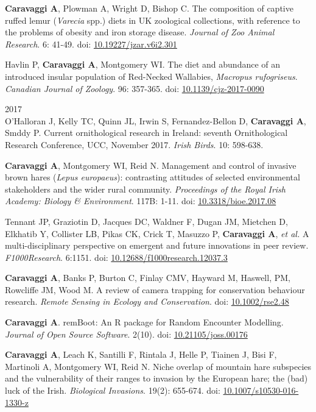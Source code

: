 \documentclass[]{article}
\begin{document}
\textbf{Caravaggi A}, Plowman A, Wright D, Bishop C. The composition of
captive ruffed lemur (\emph{Varecia} spp.) diets in UK zoological
collections, with reference to the problems of obesity and iron storage
disease. \emph{Journal of Zoo Animal Research}. 6: 41-49. doi:
\href{https://doi.org/10.19227/jzar.v6i2.301}{10.19227/jzar.v6i2.301}

Havlin P, \textbf{Caravaggi A}, Montgomery WI. The diet and abundance of
an introduced insular population of Red-Necked Wallabies, \emph{Macropus
rufogriseus}. \emph{Canadian Journal of Zoology}. 96: 357-365. doi:
\url{10.1139/cjz-2017-0090}

2017\\
O'Halloran J, Kelly TC, Quinn JL, Irwin S, Fernandez-Bellon D,
\textbf{Caravaggi A}, Smddy P. Current ornithological research in
Ireland: seventh Ornithological Research Conference, UCC, November 2017.
\emph{Irish Birds}. 10: 598-638.

\textbf{Caravaggi A}, Montgomery WI, Reid N. Management and control of
invasive brown hares (\emph{Lepus europaeus}): contrasting attitudes of
selected environmental stakeholders and the wider rural community.
\emph{Proceedings of the Royal Irish Academy: Biology \& Environment}.
117B: 1-11. doi:
\href{http://www.jstor.org/stable/10.3318/bioe.2017.08}{10.3318/bioe.2017.08}

Tennant JP, Graziotin D, Jacques DC, Waldner F, Dugan JM, Mietchen D,
Elkhatib Y, Collister LB, Pikas CK, Crick T, Masuzzo P,
\textbf{Caravaggi A}, \emph{et al.} A multi-disciplinary perspective on
emergent and future innovations in peer review. \emph{F1000Research}.
6:1151. doi:
\href{https://f1000research.com/articles/6-1151/v3}{10.12688/f1000research.12037.3}

\textbf{Caravaggi A}, Banks P, Burton C, Finlay CMV, Hayward M, Haswell,
PM, Rowcliffe JM, Wood M. A review of camera trapping for conservation
behaviour research. \emph{Remote Sensing in Ecology and Conservation}.
doi:
\href{http://onlinelibrary.wiley.com/doi/10.1002/rse2.48/abstract}{10.1002/rse2.48}

\textbf{Caravaggi A}. remBoot: An R package for Random Encounter
Modelling. \emph{Journal of Open Source Software}. 2(10). doi:
\href{http://joss.theoj.org/papers/10.21105/joss.00176}{10.21105/joss.00176}

\textbf{Caravaggi A}, Leach K, Santilli F, Rintala J, Helle P, Tiainen
J, Bisi F, Martinoli A, Montgomery WI, Reid N. Niche overlap of mountain
hare subspecies and the vulnerability of their ranges to invasion by the
European hare; the (bad) luck of the Irish. \emph{Biological Invasions}.
19(2): 655-674. doi:
\href{http://link.springer.com/article/10.1007/s10530-016-1330-z}{10.1007/s10530-016-1330-z}
\end{document}
